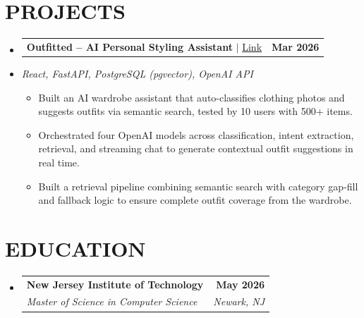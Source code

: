 \documentclass[letterpaper,11pt]{article}
\makeatletter
\newcommand{\resumeItem}[1]{
  \item\small{#1\vspace{-3pt}}
}
\newcommand{\resumeStack}[1]{
  \vspace{1pt}\item\small{\textit{#1}}\vspace{-6pt}
}
\newcommand{\resumeSubheading}[4]{
  \vspace{-3pt}\item
    \begin{tabular*}{1.0\textwidth}[t]{l@{\extracolsep{\fill}}r}
      \textbf{#1} & \textbf{\small #2} \\
      \textit{\small#3} & \textit{\small #4} \\
    \end{tabular*}\vspace{-9pt}
}
\newcommand{\resumeProjectHeading}[2]{
    \item
    \begin{tabular*}{1.001\textwidth}{l@{\extracolsep{\fill}}r}
      \small#1 & \textbf{\small #2}\\
    \end{tabular*}\vspace{-9pt}
}
\newcommand{\resumeItemListStart}{\begin{itemize}[leftmargin=0.15in, label=$\bullet$]}
\newcommand{\resumeItemListEnd}{\end{itemize}\vspace{-7pt}}
\newcommand{\resumeSubHeadingListStart}{\begin{itemize}[leftmargin=0.0in, label={}]}
\newcommand{\resumeSubHeadingListEnd}{\end{itemize}}
\makeatother
\begin{document}
\vspace{-3pt}
\section{PROJECTS}
\resumeSubHeadingListStart

\resumeProjectHeading
{\textbf{Outfitted -- AI Personal Styling Assistant} $|$ \href{https://github.com/talaviyakhushi/outfitted}{Link}}{Mar 2026}
\vspace{-9pt}
\resumeStack{React, FastAPI, PostgreSQL (pgvector), OpenAI API}
\resumeItemListStart
  \resumeItem{Built an AI wardrobe assistant that auto-classifies clothing photos and suggests outfits via semantic search, tested by 10 users with 500+ items.}
  \resumeItem{Orchestrated four OpenAI models across classification, intent extraction, retrieval, and streaming chat to generate contextual outfit suggestions in real time.}
  \resumeItem{Built a retrieval pipeline combining semantic search with category gap-fill and fallback logic to ensure complete outfit coverage from the wardrobe.}
\resumeItemListEnd

\resumeSubHeadingListEnd
\vspace{-3pt}
\section{EDUCATION}
\vspace{1pt}
\resumeSubHeadingListStart
\vspace{5pt}
\resumeSubheading
{New Jersey Institute of Technology}{May 2026}
{Master of Science in Computer Science}{Newark, NJ}
\resumeSubHeadingListEnd
\end{document}
